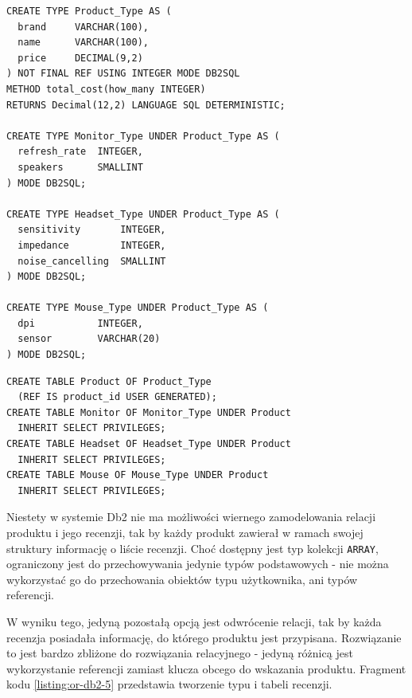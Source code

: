 \documentclass[a4paper,twoside,12pt]{book}
\begin{document}
\begin{lstlisting}[style=SQL, caption={Tworzenie typu produktu i jego podtypów w Db2.}, label={listing:or-db2-3}, captionpos=b]
CREATE TYPE Product_Type AS (
  brand     VARCHAR(100),
  name      VARCHAR(100),
  price     DECIMAL(9,2)
) NOT FINAL REF USING INTEGER MODE DB2SQL
METHOD total_cost(how_many INTEGER) 
RETURNS Decimal(12,2) LANGUAGE SQL DETERMINISTIC;

CREATE TYPE Monitor_Type UNDER Product_Type AS (
  refresh_rate  INTEGER,
  speakers      SMALLINT 
) MODE DB2SQL;

CREATE TYPE Headset_Type UNDER Product_Type AS (
  sensitivity       INTEGER,
  impedance         INTEGER,
  noise_cancelling  SMALLINT
) MODE DB2SQL;

CREATE TYPE Mouse_Type UNDER Product_Type AS (
  dpi           INTEGER,
  sensor        VARCHAR(20)
) MODE DB2SQL;
\end{lstlisting}

\vspace{0.2cm}

\begin{lstlisting}[style=SQL, caption={Tworzenie hierarchii tabel produktów w Db2.}, label={listing:or-db2-4}, captionpos=b]
CREATE TABLE Product OF Product_Type 
  (REF IS product_id USER GENERATED);
CREATE TABLE Monitor OF Monitor_Type UNDER Product 
  INHERIT SELECT PRIVILEGES;
CREATE TABLE Headset OF Headset_Type UNDER Product 
  INHERIT SELECT PRIVILEGES;
CREATE TABLE Mouse OF Mouse_Type UNDER Product 
  INHERIT SELECT PRIVILEGES;
\end{lstlisting}

\vspace{0.2cm}

Niestety w systemie Db2 nie ma możliwości wiernego zamodelowania relacji produktu i jego recenzji, tak by każdy produkt zawierał w ramach swojej struktury informację o liście recenzji. Choć dostępny jest typ kolekcji \lstinline{ARRAY}, ograniczony jest do przechowywania jedynie typów podstawowych - nie można wykorzystać go do przechowania obiektów typu użytkownika, ani typów referencji. 

\vspace{0.2cm}

W wyniku tego, jedyną pozostałą opcją jest odwrócenie relacji, tak by każda recenzja posiadała informację, do którego produktu jest przypisana. Rozwiązanie to jest bardzo zbliżone do rozwiązania relacyjnego - jedyną różnicą jest wykorzystanie referencji zamiast klucza obcego do wskazania produktu. Fragment kodu \ref{listing:or-db2-5} przedstawia tworzenie typu i tabeli recenzji. 
\end{document}
